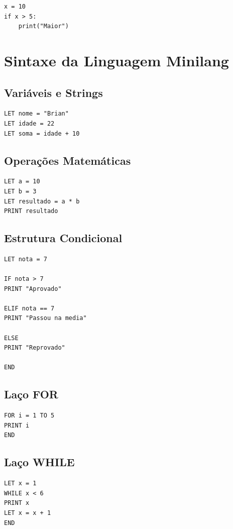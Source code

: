 \documentclass[12pt, a4paper]{article}
\begin{document}
\begin{lstlisting}[style=python, caption={Código Python gerado}]
x = 10
if x > 5:
    print("Maior")
\end{lstlisting}

\section{Sintaxe da Linguagem Minilang}

\subsection{Variáveis e Strings}
\begin{lstlisting}[style=minilang]
LET nome = "Brian"
LET idade = 22
LET soma = idade + 10
\end{lstlisting}

\subsection{Operações Matemáticas}
\begin{lstlisting}[style=minilang]
LET a = 10
LET b = 3
LET resultado = a * b
PRINT resultado
\end{lstlisting}

\subsection{Estrutura Condicional}
\begin{lstlisting}[style=minilang]
LET nota = 7

IF nota > 7
PRINT "Aprovado"

ELIF nota == 7
PRINT "Passou na media"

ELSE
PRINT "Reprovado"

END
\end{lstlisting}

\subsection{Laço FOR}
\begin{lstlisting}[style=minilang]
FOR i = 1 TO 5
PRINT i
END
\end{lstlisting}

\subsection{Laço WHILE}
\begin{lstlisting}[style=minilang]
LET x = 1
WHILE x < 6
PRINT x
LET x = x + 1
END
\end{lstlisting}
\end{document}
